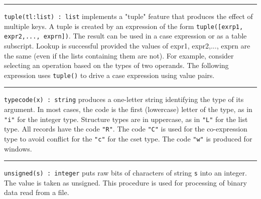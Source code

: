 \vspace{0.25cm}\hrule{}

\texttt{tuple(tl:list) : list} implements a
"tuple" feature that produces the effect of
multiple keys. A tuple is created by an expression of the form
\texttt{tuple([exrp1, expr2,..., exprn])}. The result can be used in a
case expression or as a table subscript. Lookup
is successful provided the values of expr1, expr2,..., exprn are the
same (even if the lists containing them are not). For example, consider
selecting an operation based on the types of two operands. The
following expression uses \texttt{tuple()} to drive a case expression
using value pairs.


\vspace{0.25cm}\hrule{}

\texttt{typecode(x) : string} produces a one-letter string identifying
the type of its argument. In most cases, the code is the first
(lowercase) letter of the type, as in
\texttt{"i"} for the integer type.
Structure types are in uppercase, as in
\texttt{"L"} for the list type. All records
have the code \texttt{"R"}. The code
\texttt{"C"} is used for the co-expression
type to avoid conflict for the \texttt{"c"}
for the cset type. The code \texttt{"w"} is
produced for windows. 

\vspace{0.25cm}\hrule{}

\texttt{unsigned(s) : integer} puts raw bits of characters of string
\texttt{s} into an integer. The value is taken as unsigned. This
procedure is used for processing of binary data read from a
file.

